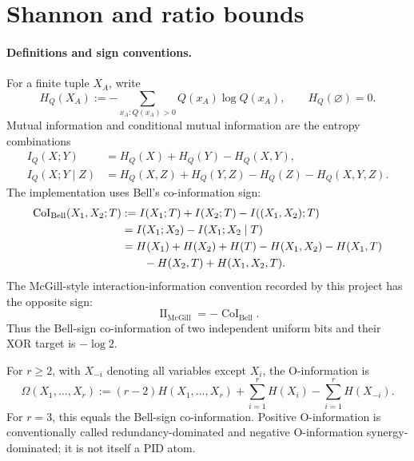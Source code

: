 \documentclass[11pt]{article}
\theoremstyle{definition}
\begin{document}
\section{Shannon and ratio bounds}

\paragraph{Definitions and sign conventions.}
For a finite tuple $X_A$, write
\[
  H_Q(X_A):=-\sum_{x_A:Q(x_A)>0}Q(x_A)\log Q(x_A),
  \qquad H_Q(\varnothing)=0.
\]
Mutual information and conditional mutual information are the entropy combinations
\begin{align}
  I_Q(X;Y)
    &=H_Q(X)+H_Q(Y)-H_Q(X,Y),\\
  I_Q(X;Y\mid Z)
    &=H_Q(X,Z)+H_Q(Y,Z)-H_Q(Z)-H_Q(X,Y,Z).
\end{align}
The implementation uses Bell's co-information sign:
\begin{align}
  \operatorname{CoI}_{\mathrm{Bell}}(X_1,X_2;T)
    &:=I(X_1;T)+I(X_2;T)-I((X_1,X_2);T)\\
    &=I(X_1;X_2)-I(X_1;X_2\mid T)\\
    &=H(X_1)+H(X_2)+H(T)-H(X_1,X_2)-H(X_1,T)\notag\\
    &\qquad{}-H(X_2,T)+H(X_1,X_2,T).
\end{align}
The McGill-style interaction-information convention recorded by this project has the opposite
sign:
\[
  \operatorname{II}_{\mathrm{McGill}}
  =-\operatorname{CoI}_{\mathrm{Bell}}.
\]
Thus the Bell-sign co-information of two independent uniform bits and their XOR target is
$-\log2$.

For $r\ge2$, with $X_{-i}$ denoting all variables except $X_i$, the O-information is
\[
  \Omega(X_1,\ldots,X_r)
  :=(r-2)H(X_1,\ldots,X_r)
    +\sum_{i=1}^{r}H(X_i)
    -\sum_{i=1}^{r}H(X_{-i}).
\]
For $r=3$, this equals the Bell-sign co-information.  Positive O-information is conventionally
called redundancy-dominated and negative O-information synergy-dominated; it is not itself a PID
atom.
\end{document}

